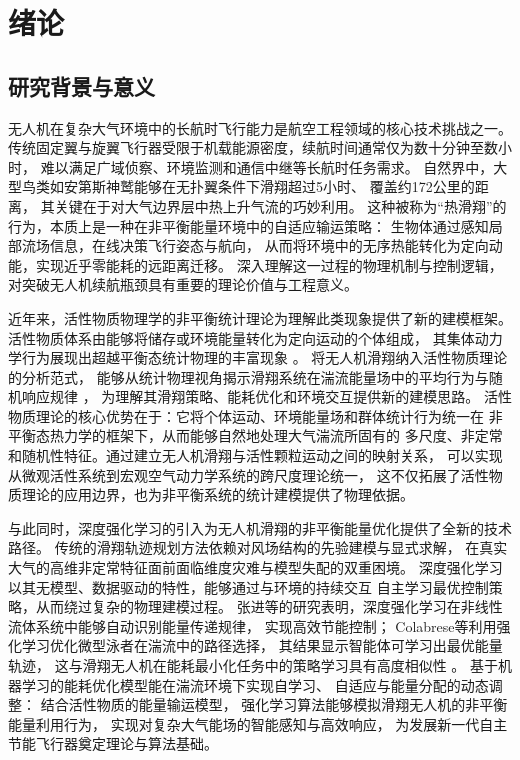 ﻿%

\chapter{绪论}

\section{研究背景与意义}

无人机在复杂大气环境中的长航时飞行能力是航空工程领域的核心技术挑战之一。
传统固定翼与旋翼飞行器受限于机载能源密度，续航时间通常仅为数十分钟至数小时，
难以满足广域侦察、环境监测和通信中继等长航时任务需求。
自然界中，大型鸟类如安第斯神鹫能够在无扑翼条件下滑翔超过5小时、
覆盖约172公里的距离\cite{xuMigrationSelfpropellingAgent2022}，
其关键在于对大气边界层中热上升气流的巧妙利用。
这种被称为“热滑翔”的行为，本质上是一种在非平衡能量环境中的自适应输运策略：
生物体通过感知局部流场信息，在线决策飞行姿态与航向，
从而将环境中的无序热能转化为定向动能，实现近乎零能耗的远距离迁移。
深入理解这一过程的物理机制与控制逻辑，
对突破无人机续航瓶颈具有重要的理论价值与工程意义。

近年来，活性物质物理学的非平衡统计理论为理解此类现象提供了新的建模框架。
活性物质体系由能够将储存或环境能量转化为定向运动的个体组成，
其集体动力学行为展现出超越平衡态统计物理的丰富现象
\cite{tonerHydrodynamicsPhasesFlocks2005}。
将无人机滑翔纳入活性物质理论的分析范式，
能够从统计物理视角揭示滑翔系统在湍流能量场中的平均行为与随机响应规律
\cite{ramaswamyMechanicsStatisticsActive2010}，
为理解其滑翔策略、能耗优化和环境交互提供新的建模思路。
活性物质理论的核心优势在于：它将个体运动、环境能量场和群体统计行为统一在
非平衡态热力学的框架下，从而能够自然地处理大气湍流所固有的
多尺度、非定常和随机性特征。通过建立无人机滑翔与活性颗粒运动之间的映射关系，
可以实现从微观活性系统到宏观空气动力学系统的跨尺度理论统一，
这不仅拓展了活性物质理论的应用边界，也为非平衡系统的统计建模提供了物理依据。

与此同时，深度强化学习的引入为无人机滑翔的非平衡能量优化提供了全新的技术路径。
传统的滑翔轨迹规划方法依赖对风场结构的先验建模与显式求解，
在真实大气的高维非定常特征面前面临维度灾难与模型失配的双重困境。
深度强化学习以其无模型、数据驱动的特性，能够通过与环境的持续交互
自主学习最优控制策略，从而绕过复杂的物理建模过程。
张进等的研究表明，深度强化学习在非线性流体系统中能够自动识别能量传递规律，
实现高效节能控制\cite{ZhangJinQiangHuaXueXiFangFaZaiYiXingPaiDongShiYanZhongDeYingYong2023}；
Colabrese等利用强化学习优化微型泳者在湍流中的路径选择，
其结果显示智能体可学习出最优能量轨迹，
这与滑翔无人机在能耗最小化任务中的策略学习具有高度相似性
\cite{colabreseSmartInertialParticles2018a}。
基于机器学习的能耗优化模型能在湍流环境下实现自学习、
自适应与能量分配的动态调整：
结合活性物质的能量输运模型，
强化学习算法能够模拟滑翔无人机的非平衡能量利用行为，
实现对复杂大气能场的智能感知与高效响应，
为发展新一代自主节能飞行器奠定理论与算法基础。

